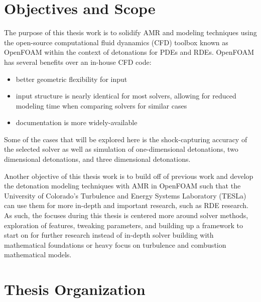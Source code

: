 \section{Objectives and Scope}
The purpose of this thesis work is to solidify AMR and modeling techniques using the open-source computational fluid dyanamics (CFD) toolbox known as OpenFOAM within the context of detonations for PDEs and RDEs. OpenFOAM has several benefits over an in-house CFD code:

\begin{itemize}
    \item better geometric flexibility for input 
    \item input structure is nearly identical for most solvers, allowing for reduced modeling time when comparing solvers for similar cases
    \item documentation is more widely-available
\end{itemize}

\noindent Some of the cases that will be explored here is the shock-capturing accuracy of the selected solver as well as simulation of one-dimensional detonations, two dimensional detonations, and three dimensional detonations.

Another objective of this thesis work is to build off of previous work \cite{towery1} and develop the detonation modeling techniques with AMR in OpenFOAM such that the University of Colorado's Turbulence and Energy Systems Laboratory (TESLa) can use them for more in-depth and important research, such as RDE research. As such, the focuses during this thesis is centered more around solver methods, exploration of features, tweaking parameters, and building up a framework to start on for further research instead of in-depth solver building with mathematical foundations or heavy focus on turbulence and combustion mathematical models. 

\section{Thesis Organization}
